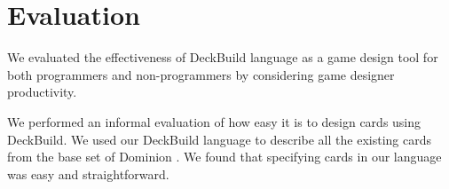 
\section{Evaluation}
\label{sec:evaluation}

We evaluated the effectiveness of DeckBuild language as a game design tool for
both programmers and non-programmers by considering game designer productivity.

We performed an informal evaluation of how easy it is to design cards using
DeckBuild. We used our DeckBuild language to describe all the existing cards
from the base set of Dominion \cite{DomCardList}. We found that specifying cards
in our language was easy and straightforward. 

